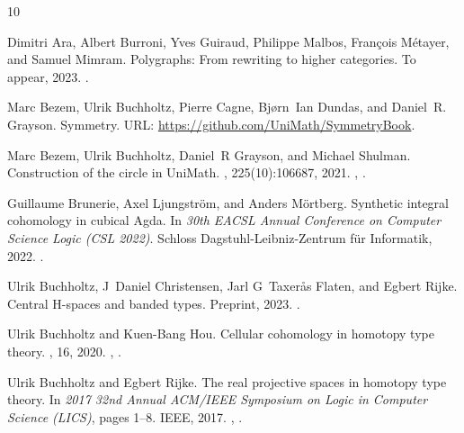 \documentclass[10pt,a4paper]{amsart}
\theoremstyle{definition}
\begin{document}

\begin{thebibliography}{10}

Dimitri Ara, Albert Burroni, Yves Guiraud, Philippe Malbos, François Métayer,
  and Samuel Mimram.
\newblock Polygraphs: From rewriting to higher categories.
\newblock To appear, 2023.
\newblock \href {https://arxiv.org/abs/2312.00429} {}.

Marc Bezem, Ulrik Buchholtz, Pierre Cagne, Bjørn~Ian Dundas, and Daniel~R.
  Grayson.
\newblock Symmetry.
\newblock URL: \url{https://github.com/UniMath/SymmetryBook}.

Marc Bezem, Ulrik Buchholtz, Daniel~R Grayson, and Michael Shulman.
\newblock Construction of the circle in {UniMath}.
, 225(10):106687, 2021.
\newblock \href {https://arxiv.org/abs/1910.01856} {},
  \href {https://doi.org/10.1016/j.jpaa.2021.106687}
  {}.

Guillaume Brunerie, Axel Ljungstr{\"o}m, and Anders M{\"o}rtberg.
\newblock Synthetic integral cohomology in cubical {A}gda.
\newblock In {\em 30th EACSL Annual Conference on Computer Science Logic (CSL
  2022)}. Schloss Dagstuhl-Leibniz-Zentrum f{\"u}r Informatik, 2022.
\newblock \href {https://doi.org/10.4230/LIPIcs.CSL.2022.11}
  {}.

Ulrik Buchholtz, J~Daniel Christensen, Jarl G~Taxer{\aa}s Flaten, and Egbert
  Rijke.
\newblock Central {H}-spaces and banded types.
\newblock Preprint, 2023.
\newblock \href {https://arxiv.org/abs/2301.02636} {}.

Ulrik Buchholtz and Kuen-Bang Hou.
\newblock Cellular cohomology in homotopy type theory.
, 16, 2020.
\newblock \href {https://arxiv.org/abs/1802.02191} {},
  \href {https://doi.org/10.23638/LMCS-16(2:7)2020}
  {}.

Ulrik Buchholtz and Egbert Rijke.
\newblock The real projective spaces in homotopy type theory.
\newblock In {\em 2017 32nd Annual ACM/IEEE Symposium on Logic in Computer
  Science (LICS)}, pages 1--8. IEEE, 2017.
\newblock \href {https://arxiv.org/abs/1704.05770} {},
  \href {https://doi.org/10.5555/3329995.3330081}
  {}.


\end{thebibliography}
\end{document}
